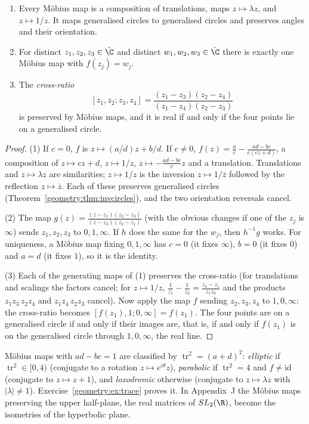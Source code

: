 \begin{theorem}\label{geometry:thm:mobius}
\begin{enumerate}
\item Every M\"obius map is a composition of translations, maps $z\mapsto\lambda z$, and $z\mapsto1/z$. It maps generalised circles to
generalised circles and preserves angles and their orientation.
\item For distinct $z_1,z_2,z_3\in\hat{\C}$ and distinct $w_1,w_2,w_3\in\hat{\C}$ there is exactly one M\"obius map with $f(z_j)=w_j$.
\item The \emph{cross-ratio}
\[
[z_1,z_2;z_3,z_4]=\frac{(z_1-z_3)(z_2-z_4)}{(z_1-z_4)(z_2-z_3)}
\]
is preserved by M\"obius maps, and it is real if and only if the four points lie on a generalised circle.
\end{enumerate}
\end{theorem}
\begin{proof}
(1) If $c=0$, $f$ is $z\mapsto(a/d)z+b/d$. If $c\ne0$, $f(z)=\frac ac-\frac{ad-bc}{c(cz+d)}$, a composition of $z\mapsto cz+d$, $z\mapsto1/z$,
$z\mapsto-\frac{ad-bc}cz$ and a translation. Translations and $z\mapsto\lambda z$ are similarities; $z\mapsto1/z$ is the inversion $z\mapsto1/\bar z$
followed by the reflection $z\mapsto\bar z$. Each of these preserves generalised circles (Theorem~\ref{geometry:thm:invcircles}), and the two orientation
reversals cancel.

(2) The map $g(z)=\frac{(z-z_1)(z_2-z_3)}{(z-z_3)(z_2-z_1)}$ (with the obvious changes if one of the $z_j$ is $\infty$) sends $z_1,z_2,z_3$ to
$0,1,\infty$. If $h$ does the same for the $w_j$, then $h^{-1}g$ works. For uniqueness, a M\"obius map fixing $0,1,\infty$ has $c=0$ (it fixes
$\infty$), $b=0$ (it fixes $0$) and $a=d$ (it fixes $1$), so it is the identity.

(3) Each of the generating maps of (1) preserves the cross-ratio (for translations and scalings the factors cancel; for $z\mapsto1/z$,
$\frac1{z_1}-\frac1{z_3}=\frac{z_3-z_1}{z_1z_3}$ and the products $z_1z_3\,z_2z_4$ and $z_1z_4\,z_2z_3$ cancel). Now apply the map $f$ sending
$z_2,z_3,z_4$ to $1,0,\infty$: the cross-ratio becomes $[f(z_1),1;0,\infty]=f(z_1)$. The four points are on a generalised circle if and only if
their images are, that is, if and only if $f(z_1)$ is on the generalised circle through $1,0,\infty$, the real line.
\end{proof}

\begin{remark}
M\"obius maps with $ad-bc=1$ are classified by $\operatorname{tr}^2=(a+d)^2$: \emph{elliptic} if $\operatorname{tr}^2\in[0,4)$ (conjugate to a rotation
$z\mapsto e^{i\theta}z$), \emph{parabolic} if $\operatorname{tr}^2=4$ and $f\ne\mathrm{id}$ (conjugate to $z\mapsto z+1$), and \emph{loxodromic} otherwise
(conjugate to $z\mapsto\lambda z$ with $|\lambda|\ne1$). Exercise~\ref{geometry:ex:trace} proves it. In Appendix~J the M\"obius maps preserving the upper
half-plane, the real matrices of $SL_2(\R)$, become the isometries of the hyperbolic plane.
\end{remark}

